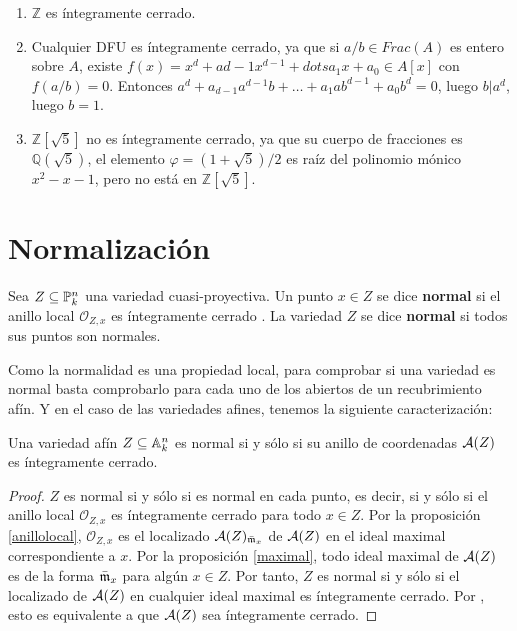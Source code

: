 \documentclass[ACGA.tex]{subfiles}
\begin{document}
\begin{ejs}\mbox{}
\begin{enumerate}
	\item $\mathbb{Z}$ es íntegramente cerrado.
	\item Cualquier DFU es íntegramente cerrado, ya que si $a/b \in Frac(A)$ es entero sobre $A$, existe $f(x) = x^d+a{d-1}x^{d-1}+dots a_1x+a_0 \in A[x]$ con $f(a/b) = 0$. Entonces $a^d+a_{d-1}a^{d-1}b+\dots+a_1ab^{d-1}+a_0b^d = 0$, luego $b | a^d$, luego $b=1$.
	\item $\mathbb{Z}[\sqrt{5}] $ no es íntegramente cerrado, ya que su cuerpo de fracciones es $\mathbb{Q}(\sqrt{5})$, el elemento $\varphi = (1+\sqrt{5})/2$ es raíz del polinomio mónico $x^2-x-1$, pero no está en $\mathbb{Z}[\sqrt{5}]$.
\end{enumerate}
\end{ejs}
 
\section{Normalización}

\begin{defi}
 Sea $Z\subseteq\mathbb{P}^n_k$ una variedad cuasi-proyectiva. Un punto $x\in Z$ se dice {\bf normal} si el anillo local ${\mathcal O}_{Z,x}$ es íntegramente cerrado \cite[Capítulo 5]{am}. La variedad $Z$ se dice {\bf normal} si todos sus puntos son normales.
\end{defi}

Como la normalidad es una propiedad local, para comprobar si una variedad es normal basta comprobarlo para cada uno de los abiertos de un recubrimiento afín. Y en el caso de las variedades afines, tenemos la siguiente caracterización:

\begin{prop}
 Una variedad afín $Z\subseteq\mathbb{A}^n_k$ es normal si y sólo si su anillo de coordenadas $\mathcal{A}(Z)$ es íntegramente cerrado.
\end{prop}

\begin{proof}
 $Z$ es normal si y sólo si es normal en cada punto, es decir, si y sólo si el anillo local ${\mathcal O}_{Z,x}$ es íntegramente cerrado para todo $x\in Z$. Por la proposición \ref{anillolocal}, ${\mathcal O}_{Z,x}$ es el localizado $\mathcal{A}(Z)_{\bar{{\mathfrak{m}}}_x}$ de $\mathcal{A}(Z)$ en el ideal maximal correspondiente a $x$. Por la proposición \ref{maximal}, todo ideal maximal de $\mathcal{A}(Z)$ es de la forma $\bar{{\mathfrak{m}}}_x$ para algún $x\in Z$. Por tanto, $Z$ es normal si y sólo si el localizado de $\mathcal{A}(Z)$ en cualquier ideal maximal es íntegramente cerrado. Por \cite[proposición 5.13]{am}, esto es equivalente a que $\mathcal{A}(Z)$ sea íntegramente cerrado.
\end{proof}
\end{document}
